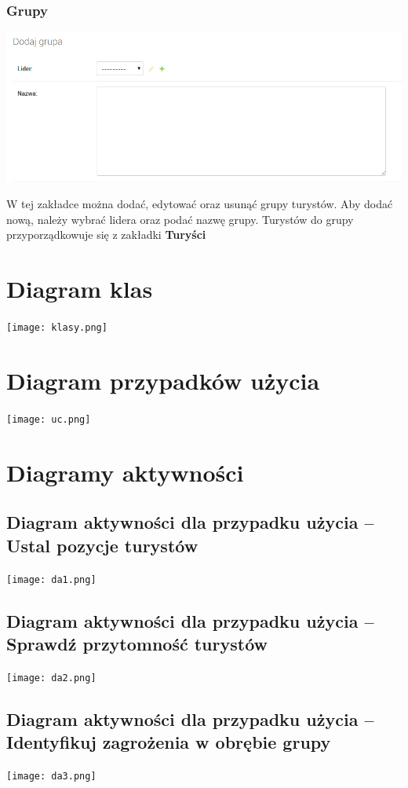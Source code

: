 \documentclass[a4paper,12pt]{article}
\begin{document}
\subsubsection{Grupy}
\begin{center}
\includegraphics[scale=1]{ui7.png}
\end{center}
W tej zakładce można dodać, edytować oraz usunąć grupy turystów. Aby dodać nową, należy wybrać lidera oraz podać nazwę grupy. Turystów do grupy przyporządkowuje się z zakładki \textbf{Turyści}
\section{Diagram klas}
\begin{center}
\texttt{[image: klasy.png]}
\end{center}
\section{Diagram przypadków użycia}
\texttt{[image: uc.png]}
\section{Diagramy aktywności}
\subsection{Diagram aktywności dla przypadku użycia -- Ustal pozycje turystów}
\begin{center}
\texttt{[image: da1.png]}
\end{center}
\newpage
\subsection{Diagram aktywności dla przypadku użycia -- Sprawdź przytomność turystów}
\texttt{[image: da2.png]}
\newpage
\subsection{Diagram aktywności dla przypadku użycia -- Identyfikuj zagrożenia w obrębie grupy}
\texttt{[image: da3.png]}
\newpage
\end{document}
